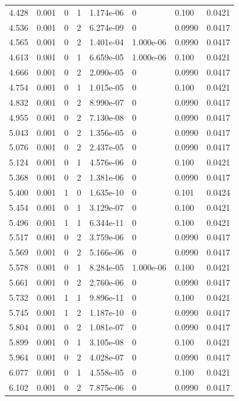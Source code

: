 \documentclass[preview]{standalone}
\begin{document}
{{{\begin{tabular}{L{1.2cm}C{1.2cm} C{0.3cm}C{0.5cm} C{1.4cm}C{1.4cm} C{1.4cm}C{1.4cm}}
  4.428  &  0.001  & 0     &  1 &  1.174e-06  & 0  & 0.100 &  0.0421   \\ 
  4.536  &  0.001  & 0     &  2 &  6.274e-09  & 0  & 0.0990 &  0.0417   \\ 
  4.565  &  0.001  & 0     &  2 &  1.401e-04  & 1.000e-06  & 0.0990 &  0.0417   \\ 
  4.613  &  0.001  & 0     &  1 &  6.659e-05  & 1.000e-06  & 0.100 &  0.0421   \\ 
  4.666  &  0.001  & 0     &  2 &  2.090e-05  & 0  & 0.0990 &  0.0417   \\ 
  4.754  &  0.001  & 0     &  1 &  1.015e-05  & 0  & 0.100 &  0.0421   \\ 
  4.832  &  0.001  & 0     &  2 &  8.990e-07  & 0  & 0.0990 &  0.0417   \\ 
  4.955  &  0.001  & 0     &  2 &  7.130e-08  & 0  & 0.0990 &  0.0417   \\ 
  5.043  &  0.001  & 0     &  2 &  1.356e-05  & 0  & 0.0990 &  0.0417   \\ 
  5.076  &  0.001  & 0     &  2 &  2.437e-05  & 0  & 0.0990 &  0.0417   \\ 
  5.124  &  0.001  & 0     &  1 &  4.576e-06  & 0  & 0.100 &  0.0421   \\ 
  5.368  &  0.001  & 0     &  2 &  1.381e-06  & 0  & 0.0990 &  0.0417   \\ 
  5.400  &  0.001  & 1     &  0 &  1.635e-10  & 0  & 0.101 &  0.0424   \\ 
  5.454  &  0.001  & 0     &  1 &  3.129e-07  & 0  & 0.100 &  0.0421   \\ 
  5.496  &  0.001  & 1     &  1 &  6.344e-11  & 0  & 0.100 &  0.0421   \\ 
  5.517  &  0.001  & 0     &  2 &  3.759e-06  & 0  & 0.0990 &  0.0417   \\ 
  5.569  &  0.001  & 0     &  2 &  5.166e-06  & 0  & 0.0990 &  0.0417   \\ 
  5.578  &  0.001  & 0     &  1 &  8.284e-05  & 1.000e-06  & 0.100 &  0.0421   \\ 
  5.661  &  0.001  & 0     &  2 &  2.760e-06  & 0  & 0.0990 &  0.0417   \\ 
  5.732  &  0.001  & 1     &  1 &  9.896e-11  & 0  & 0.100 &  0.0421   \\ 
  5.745  &  0.001  & 1     &  2 &  1.187e-10  & 0  & 0.0990 &  0.0417   \\ 
  5.804  &  0.001  & 0     &  2 &  1.081e-07  & 0  & 0.0990 &  0.0417   \\ 
  5.899  &  0.001  & 0     &  1 &  3.105e-08  & 0  & 0.100 &  0.0421   \\ 
  5.964  &  0.001  & 0     &  2 &  4.028e-07  & 0  & 0.0990 &  0.0417   \\ 
  6.077  &  0.001  & 0     &  1 &  4.558e-05  & 0  & 0.100 &  0.0421   \\ 
  6.102  &  0.001  & 0     &  2 &  7.875e-06  & 0  & 0.0990 &  0.0417   \\ 
\hline 
\end{tabular} 

}}}
\end{document}
